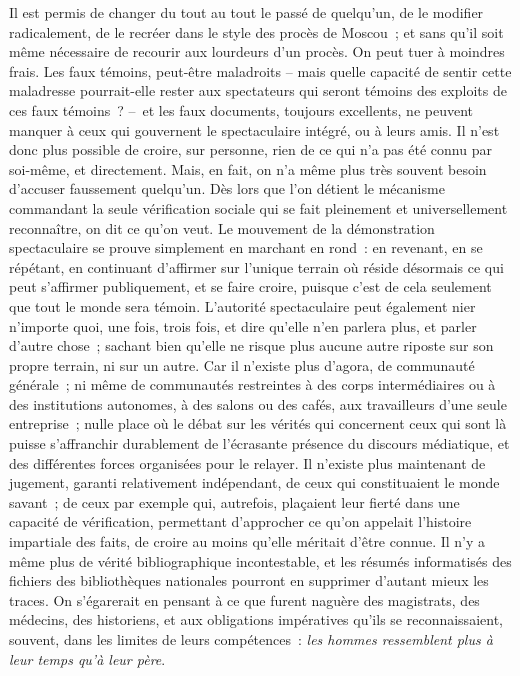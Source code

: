 \documentclass[french,twoside]{book} %
\begin{document}
Il est permis de changer du tout au tout le passé de quelqu’un, de le modifier radicalement, de le recréer dans le style des procès de Moscou ; et sans qu’il soit même nécessaire de recourir aux lourdeurs d’un procès. On peut tuer à moindres frais. Les faux témoins, peut-être maladroits – mais quelle capacité de sentir cette maladresse pourrait-elle rester aux spectateurs qui seront témoins des exploits de ces faux témoins ? – et les faux documents, toujours excellents, ne peuvent manquer à ceux qui gouvernent le spectaculaire intégré, ou à leurs amis. Il n’est donc plus possible de croire, sur personne, rien de ce qui n’a pas été connu par soi-même, et directement. Mais, en fait, on n’a même plus très souvent besoin d’accuser faussement quelqu’un. Dès lors que l’on détient le mécanisme commandant la seule vérification sociale qui se fait pleinement et universellement reconnaître, on dit ce qu’on veut. Le mouvement de la démonstration spectaculaire se prouve simplement en marchant en rond : en revenant, en se répétant, en continuant d’affirmer sur l’unique terrain où réside désormais ce qui peut s’affirmer publiquement, et se faire croire, puisque c’est de cela seulement que tout le monde sera témoin. L’autorité spectaculaire peut également nier n’importe quoi, une fois, trois fois, et dire qu’elle n’en parlera plus, et parler d’autre chose ; sachant bien qu’elle ne risque plus aucune autre riposte sur son propre terrain, ni sur un autre. Car il n’existe plus d’agora, de communauté générale ; ni même de communautés restreintes à des corps intermédiaires ou à des institutions autonomes, à des salons ou des cafés, aux travailleurs d’une seule entreprise ; nulle place où le débat sur les vérités qui concernent ceux qui sont là puisse s’affranchir durablement de l’écrasante présence du discours médiatique, et des différentes forces organisées pour le relayer. Il n’existe plus maintenant de jugement, garanti relativement indépendant, de ceux qui constituaient le monde savant ; de ceux par exemple qui, autrefois, plaçaient leur fierté dans une capacité de vérification, permettant d’approcher ce qu’on appelait l’histoire impartiale des faits, de croire au moins qu’elle méritait d’être connue. Il n’y a même plus de vérité bibliographique incontestable, et les résumés informatisés des fichiers des bibliothèques nationales pourront en supprimer d’autant mieux les traces. On s’égarerait en pensant à ce que furent naguère des magistrats, des médecins, des historiens, et aux obligations impératives qu’ils se reconnaissaient, souvent, dans les limites de leurs compétences : \emph{les hommes ressemblent plus à leur temps qu’à leur père}.\par
\end{document}
